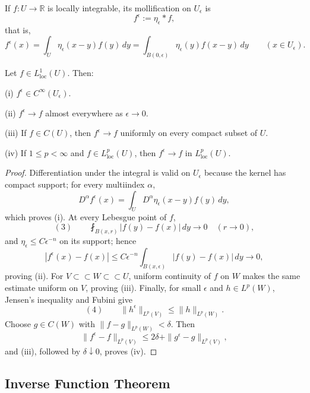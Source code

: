 \begin{definition}[Mollification]
\label{def:mollification}
If $f:U\to\mathbb R$ is locally integrable, its mollification on $U_\epsilon$ is
\[
f^\epsilon:=\eta_\epsilon*f,
\]
that is,
\[
f^\epsilon(x)
=\int_U\eta_\epsilon(x-y)f(y)\,dy
=\int_{B(0,\epsilon)}\eta_\epsilon(y)f(x-y)\,dy
\qquad(x\in U_\epsilon).
\]
\end{definition}

\begin{theorem}
\label{thm:properties-of-mollifiers}
Let $f\in L^1_{\mathrm{loc}}(U)$. Then:

(i) $f^\epsilon\in C^\infty(U_\epsilon)$.

(ii) $f^\epsilon\to f$ almost everywhere as $\epsilon\to0$.

(iii) If $f\in C(U)$, then $f^\epsilon\to f$ uniformly on every compact subset of $U$.

(iv) If $1\leq p<\infty$ and $f\in L^p_{\mathrm{loc}}(U)$, then $f^\epsilon\to f$ in $L^p_{\mathrm{loc}}(U)$.
\end{theorem}
\begin{proof}
\sketch Differentiation under the integral is valid on $U_\epsilon$ because the kernel has compact support; for every multiindex $\alpha$,
\[
D^\alpha f^\epsilon(x)
=\int_UD^\alpha\eta_\epsilon(x-y)f(y)\,dy,
\]
which proves (i). At every Lebesgue point of $f$,
\[
(3)\qquad
\fint_{B(x,r)}|f(y)-f(x)|\,dy\longrightarrow0
\quad(r\to0),
\]
and $\eta_\epsilon\leq C\epsilon^{-n}$ on its support; hence
\[
|f^\epsilon(x)-f(x)|
\leq C\epsilon^{-n}
\int_{B(x,\epsilon)}|f(y)-f(x)|\,dy\longrightarrow0,
\]
proving (ii). For $V\subset\subset W\subset\subset U$, uniform continuity of $f$ on $W$ makes the same estimate uniform on $V$, proving (iii). Finally, for small $\epsilon$ and $h\in L^p(W)$, Jensen's inequality and Fubini give
\[
(4)\qquad
\|h^\epsilon\|_{L^p(V)}\leq\|h\|_{L^p(W)}.
\]
Choose $g\in C(W)$ with $\|f-g\|_{L^p(W)}<\delta$. Then
\[
\|f^\epsilon-f\|_{L^p(V)}
\leq2\delta+\|g^\epsilon-g\|_{L^p(V)},
\]
and (iii), followed by $\delta\downarrow0$, proves (iv).
\end{proof}

\subsection{Inverse Function Theorem}

